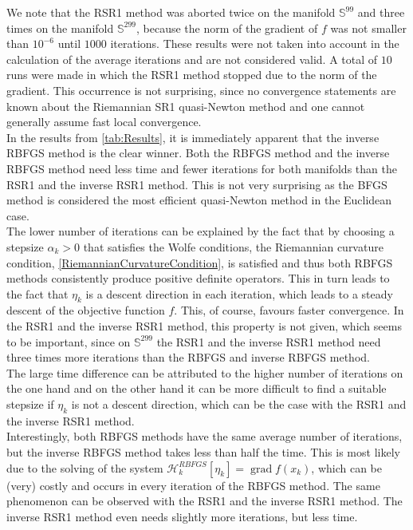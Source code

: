 We note that the RSR1 method was aborted twice on the manifold $\mathbb{S}^{99}$ and three times on the manifold $\mathbb{S}^{299}$, because the norm of the gradient of $f$ was not smaller than $10^{-6}$ until $1000$ iterations. These results were not taken into account in the calculation of the average iterations and are not considered valid. A total of $10$ runs were made in which the RSR1 method stopped due to the norm of the gradient. This occurrence is not surprising, since no convergence statements are known about the Riemannian SR1 quasi-Newton method and one cannot generally assume fast local convergence. \\
In the results from \cref{tab:Results}, it is immediately apparent that the inverse RBFGS method is the clear winner. Both the RBFGS method and the inverse RBFGS method need less time and fewer iterations for both manifolds than the RSR1 and the inverse RSR1 method. This is not very surprising as the BFGS method is considered the most efficient quasi-Newton method in the Euclidean case. \\
The lower number of iterations can be explained by the fact that by choosing a stepsize $\alpha_k > 0$ that satisfies the Wolfe conditions, the Riemannian curvature condition, \cref{RiemannianCurvatureCondition}, is satisfied and thus both RBFGS methods consistently produce positive definite operators. This in turn leads to the fact that $\eta_k$ is a descent direction in each iteration, which leads to a steady descent of the objective function $f$. This, of course, favours faster convergence. In the RSR1 and the inverse RSR1 method, this property is not given, which seems to be important, since on $\mathbb{S}^{299}$ the RSR1 and the inverse RSR1 method need three times more iterations than the RBFGS and inverse RBFGS method. \\
The large time difference can be attributed to the higher number of iterations on the one hand and on the other hand it can be more difficult to find a suitable stepsize if $\eta_k$ is not a descent direction, which can be the case with the RSR1 and the inverse RSR1 method. \\
Interestingly, both RBFGS methods have the same average number of iterations, but the inverse RBFGS method takes less than half the time. This is most likely due to the solving of the system $\mathcal{H}^{RBFGS}_k [\eta_k] = \operatorname{grad} f(x_k)$, which can be (very) costly and occurs in every iteration of the RBFGS method. The same phenomenon can be observed with the RSR1 and the inverse RSR1 method. The inverse RSR1 method even needs slightly more iterations, but less time.

